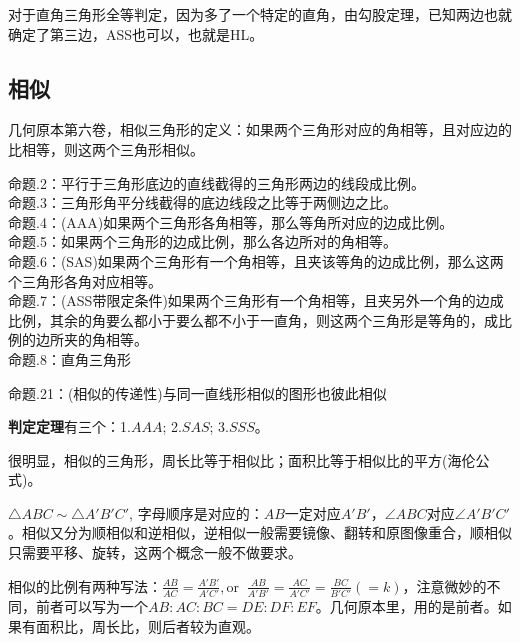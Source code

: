 \documentclass[../main.tex]{subfiles}
\begin{document}
  对于直角三角形全等判定，因为多了一个特定的直角，由勾股定理，已知两边也就确定了第三边，ASS也可以，也就是HL。

\subsection{相似}
几何原本第六卷，相似三角形的定义：如果两个三角形对应的角相等，且对应边的比相等，则这两个三角形相似。

命题\uppercase\expandafter{}.2：平行于三角形底边的直线截得的三角形两边的线段成比例。\\
命题\uppercase\expandafter{}.3：三角形角平分线截得的底边线段之比等于两侧边之比。\\
命题\uppercase\expandafter{}.4：(AAA)如果两个三角形各角相等，那么等角所对应的边成比例。\\
命题\uppercase\expandafter{}.5：如果两个三角形的边成比例，那么各边所对的角相等。\\
命题\uppercase\expandafter{}.6：(SAS)如果两个三角形有一个角相等，且夹该等角的边成比例，那么这两个三角形各角对应相等。\\
命题\uppercase\expandafter{}.7：(ASS带限定条件)如果两个三角形有一个角相等，且夹另外一个角的边成比例，其余的角要么都小于要么都不小于一直角，则这两个三角形是等角的，成比例的边所夹的角相等。\\
命题\uppercase\expandafter{}.8：直角三角形

命题\uppercase\expandafter{}.21：(相似的传递性)与同一直线形相似的图形也彼此相似

\textbf{判定定理}有三个：1.$AAA$; 2.$SAS$; 3.$SSS$。

很明显，相似的三角形，周长比等于相似比；面积比等于相似比的平方(海伦公式)。

$\triangle ABC \sim \triangle A'B'C'$, 字母顺序是对应的：$AB$一定对应$A'B'$，$\angle ABC$对应$\angle A'B'C'$。相似又分为顺相似和逆相似，逆相似一般需要镜像、翻转和原图像重合，顺相似只需要平移、旋转，这两个概念一般不做要求。

相似的比例有两种写法：$\frac{AB}{AC}=\frac{A'B'}{A'C'},  \text{or}\;\; \frac{AB}{A'B'}=\frac{AC}{A'C'}=\frac{BC}{B'C'}(=k)$，注意微妙的不同，前者可以写为一个$ AB:AC:BC=DE:DF:EF$。几何原本里，用的是前者。如果有面积比，周长比，则后者较为直观。
\end{document}
